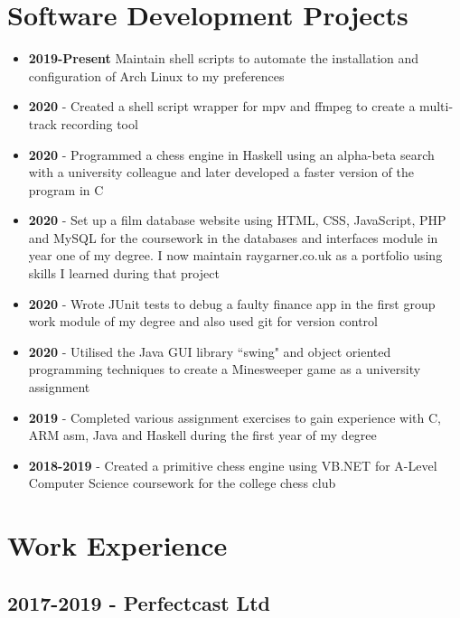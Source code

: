 \documentclass{article}
\begin{document}
\section{Software Development Projects}

\begin{itemize}[noitemsep]

\item \textbf{2019-Present} Maintain shell scripts to automate the installation and configuration of Arch Linux to my preferences 
\item \textbf{2020} - Created a shell script wrapper for mpv and ffmpeg to create a multi-track recording tool
\item \textbf{2020} - Programmed a chess engine in Haskell using an alpha-beta search with a university colleague and later developed a faster version of the program in C
\item \textbf{2020} - Set up a film database website using HTML, CSS, JavaScript, PHP and MySQL for the coursework in the databases and interfaces module in year one of my degree. I now maintain raygarner.co.uk as a portfolio using skills I learned during that project
\item \textbf{2020} - Wrote JUnit tests to debug a faulty finance app in the first group work module of my degree and also used git for version control
\item \textbf{2020} - Utilised the Java GUI library ``swing" and object oriented programming techniques to create a Minesweeper game as a university assignment
\item \textbf{2019} - Completed various assignment exercises to gain experience with C, ARM asm, Java and Haskell during the first year of my degree
\item \textbf{2018-2019} - Created a primitive chess engine using VB.NET for A-Level Computer Science coursework for the college chess club

\end{itemize}





\section{Work Experience}
\subsection{2017-2019 - Perfectcast Ltd}
\end{document}
